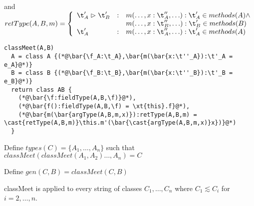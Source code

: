 \documentclass{report}
\newcommand{\spec}{\vartriangleright}
\begin{document}
and $retType(A,B,m) = \left\{\begin{array}{lcl}
\t'_A \spec \t'_B &:& m(\ldots,{x:\t''_A},\ldots):\t'_A\in methods(A) \wedge \\
&&m(\ldots,x:\t''_B,\ldots):\t'_B \in methods(B)\\
\t'_A &:& m(\ldots,{x:\t''_A},\ldots):\t'_A\in methods(A) 
\end{array}\right.$
\begin{lstlisting}
classMeet(A,B)
  A = class A {(*@\bar{\f_A:\t_A},\bar{m(\bar{x:\t''_A}):\t'_A = e_A}@*)}
  B = class B {(*@\bar{\f_B:\t_B},\bar{m(\bar{x:\t''_B}):\t'_B = e_B}@*)}
  return class AB {
    (*@\bar{\f:fieldType(A,B,\f)}@*),
    (*@\bar{f():fieldType(A,B,\f) = \xt{this}.f}@*),
    (*@\bar{m(\bar{argType(A,B,m,x)}):retType(A,B,m) = \cast{retType(A,B,m)}\this.m'(\bar{\cast{argType(A,B,m,x)}x})}@*)
  }
\end{lstlisting}

Define $types(C) = \{A_1,\ldots,A_n\}$ such that $classMeet(classMeet(A_1,A_2)\ldots,A_n) = C$

Define $gen(C, B) = classMeet(C,B)$

classMeet is applied to every string of classes $C_1,\ldots,C_n$ where $C_1 \lesssim C_i$ for $i=2,\ldots,n$.

\end{document}
